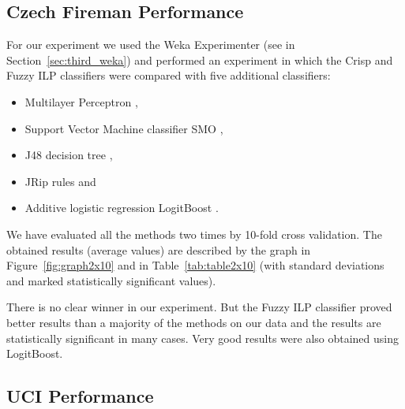 \subsection{Czech Fireman Performance}


For our experiment we used the Weka Experimenter (see in Section~\ref{sec:third_weka}) and performed an experiment in which the Crisp and Fuzzy ILP classifiers were compared with five additional classifiers:
\begin{itemize}
	\item Multilayer Perceptron \citep{biblio:bishop-1995},
	\item Support Vector Machine classifier SMO \citep{biblio:SMO},
	\item J48 decision tree \citep{biblio:J48},
	\item JRip rules \citep{weka:JRip} and
	\item Additive logistic regression LogitBoost \citep{biblio:LogitBoost}.
\end{itemize}
We have evaluated all the methods two times by 10-fold cross validation. %
The obtained results (average values) are described by the graph in Figure~\ref{fig:graph2x10} and in Table~\ref{tab:table2x10} (with standard deviations and marked statistically significant values).

There is no clear winner in our experiment. But the Fuzzy ILP classifier proved better results than a majority of the methods on our data and the results are statistically significant in many cases. Very good results were also obtained using LogitBoost. 



\subsection{UCI Performance} \label{sec:fuzzy_eval_uci}


